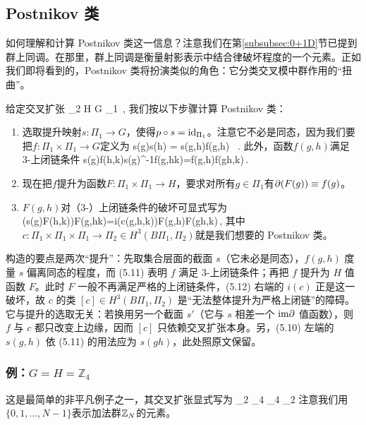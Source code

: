 \subsection{Postnikov 类}\label{sec:Postnikov}

如何理解和计算 Postnikov 类这一信息？注意我们在第\ref{subsubsec:0+1D}节已提到群上同调。在那里，群上同调是衡量射影表示中结合律破坏程度的一个元素。正如我们即将看到的，Postnikov 类将扮演类似的角色：它分类交叉模中群作用的“扭曲”。

给定交叉扩张
\to \Pi_2  H \stack{\ptl}{\longrightarrow} G   \Pi_1 \,, \ee
我们按以下步骤计算 Postnikov 类：
\begin{enumerate}
    \item 选取提升映射$s: \Pi_1\to G$，使得$p\circ s = {\rm id}_{\Pi_1}$。注意它不必是同态，因为我们要把$f: \Pi_1\times \Pi_1 \to G$定义为
    \be  s(g)s(h) = s(g,h)f(g,h) \ . \ee
    此外，函数$f(g,h)$满足 3-上闭链条件
    \be
    s(g)f(h,k)s(g)^{-1}f(g,hk)=f(g,h)f(gh,k)\,.
    \ee
    \item 现在把$f$提升为函数$F:\Pi_1\times\Pi_1\rightarrow H$，要求对所有$g\in\Pi_1$有$\partial (F(g))\equiv f(g)$。
    \item $F(g,h)$对（3-）上闭链条件的破坏可显式写为
    \be
    \label{cocycle-F}
    (s(g)\rhd F(h,k))F(g,hk)=i(c(g,h,k))F(g,h)F(gh,k)\,,
    \ee
    其中$c:\Pi_1\times\Pi_1\times\Pi_1\rightarrow\Pi_2\in H^3(B\Pi_1,\Pi_2) $就是我们想要的 Postnikov 类。
\end{enumerate}

\begin{yizhu}构造的要点是两次“提升”：先取集合层面的截面 $s$（它未必是同态），$f(g,h)$ 度量 $s$ 偏离同态的程度，而 (5.11) 表明 $f$ 满足 3-上闭链条件；再把 $f$ 提升为 $H$ 值函数 $F$。此时 $F$ 一般不再满足严格的上闭链条件，(5.12) 右端的 $i(c)$ 正是这一破坏，故 $c$ 的类 $[c]\in H^3(B\Pi_1,\Pi_2)$ 是“无法整体提升为严格上闭链”的障碍。它与提升的选取无关：若换用另一个截面 $s'$（它与 $s$ 相差一个 ${\rm im}\partial$ 值函数），则 $f$ 与 $c$ 都只改变上边缘，因而 $[c]$ 只依赖交叉扩张本身。另，(5.10) 左端的 $s(g,h)$ 依 (5.11) 的用法应为 $s(gh)$，此处照原文保留。\end{yizhu}

\subsubsection{例：$G = H = \mathbb{Z}_4$}
这是最简单的非平凡例子之一，其交叉扩张显式写为
\to \bbZ_2  \bbZ_4  \bbZ_4   \bbZ_2  \ee
注意我们用$\{0,1,\dots,N-1\}$表示加法群$\mathbb{Z}_N$的元素。

